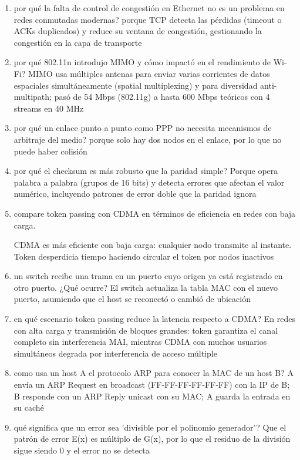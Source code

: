 \begin{enumerate}
\item por qué la falta de control de congestión en Ethernet no es un problema en redes conmutadas modernas?
porque TCP detecta las pérdidas (timeout o ACKs duplicados) y reduce su ventana de congestión, gestionando la congestión en la capa de transporte

\item por qué 802.11n introdujo MIMO y cómo impactó en el rendimiento de Wi-Fi?
MIMO usa múltiples antenas para enviar varias corrientes de datos espaciales simultáneamente (spatial multiplexing) y para diversidad anti-multipath; pasó de 54 Mbps (802.11g) a hasta 600 Mbps teóricos con 4 streams en 40 MHz

\item por qué un enlace punto a punto como PPP no necesita mecanismos de arbitraje del medio?
porque solo hay dos nodos en el enlace, por lo que no puede haber colisión

\item por qué el checksum es más robusto que la paridad simple?
Porque opera palabra a palabra (grupos de 16 bits) y detecta errores que afectan el valor numérico, incluyendo patrones de error doble que la paridad ignora

\item compare token passing con CDMA en términos de eficiencia en redes con baja carga.

CDMA es más eficiente con baja carga: cualquier nodo transmite al instante. Token desperdicia tiempo haciendo circular el token por nodos inactivos
\item nn switch recibe una trama en un puerto cuyo origen ya está registrado en otro puerto. ¿Qué ocurre?
El switch actualiza la tabla MAC con el nuevo puerto, asumiendo que el host se reconectó o cambió de ubicación

\item en qué escenario token passing reduce la latencia respecto a CDMA?
En redes con alta carga y transmisión de bloques grandes: token garantiza el canal completo sin interferencia MAI, mientras CDMA con muchos usuarios simultáneos degrada por interferencia de acceso múltiple

\item como usa un host A el protocolo ARP para conocer la MAC de un host B?
A envía un ARP Request en broadcast (FF-FF-FF-FF-FF-FF) con la IP de B; B responde con un ARP Reply unicast con su MAC; A guarda la entrada en su caché

\item qué significa que un error sea 'divisible por el polinomio generador'?
Que el patrón de error E(x) es múltiplo de G(x), por lo que el residuo de la división sigue siendo 0 y el error no se detecta


\end{enumerate}

